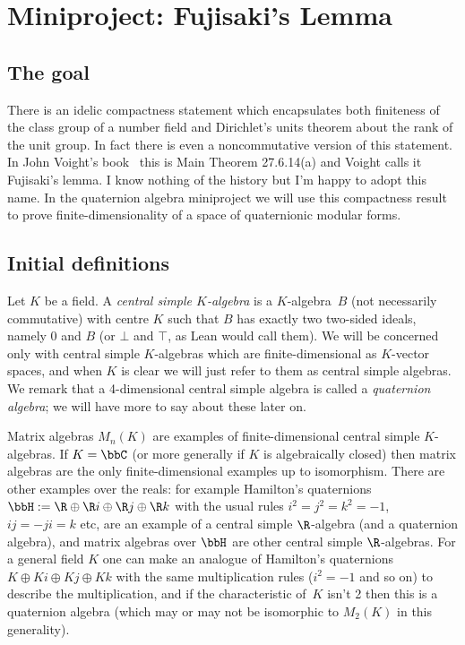 \chapter{Miniproject: Fujisaki's Lemma}\label{Fujisaki_project}

\section{The goal}

There is an idelic compactness statement which encapsulates both finiteness of the class
group of a number field and Dirichlet's units theorem about the rank of the unit group.
In fact there is even a noncommutative version of this statement. In John Voight's
book~\cite{voightbook} this is Main Theorem 27.6.14(a) and Voight calls it Fujisaki’s lemma.
I know nothing of the history but I'm happy to adopt this name. In the quaternion algebra
miniproject we will use this compactness result to prove finite-dimensionality of a
space of quaternionic modular forms.

\section{Initial definitions}

Let $K$ be a field. A \emph{central simple $K$-algebra} is a $K$-algebra~$B$ (not necessarily
commutative) with centre $K$ such that $B$ has exactly two two-sided ideals, namely ${0}$ and $B$
(or $\bot$ and $\top$, as Lean would call them). We will be concerned
only with central simple $K$-algebras which are finite-dimensional as $K$-vector spaces, and
when $K$ is clear we will just refer to them as central simple algebras. We remark that a
4-dimensional central simple algebra is called a \emph{quaternion algebra}; we will have
more to say about these later on.

Matrix algebras $M_n(K)$ are examples of finite-dimensional central simple $K$-algebras.
If $K=\bbC$ (or more generally if $K$ is algebraically closed)
then matrix algebras are the only finite-dimensional examples
up to isomorphism. There are other examples over the reals: for example Hamilton's quaternions
$\bbH:=\R\oplus\R i\oplus\R j\oplus\R k$ with the usual rules $i^2=j^2=k^2=-1$,
$ij=-ji=k$ etc, are an example of a central simple $\R$-algebra (and a quaternion algebra), and
matrix algebras over $\bbH$ are other central simple $\R$-algebras.
For a general field $K$
one can make an analogue of Hamilton's quaternions $K\oplus Ki\oplus Kj\oplus Kk$ with the
same multiplication rules ($i^2=-1$ and so on) to describe the multiplication, and if the characteristic
of~$K$ isn't 2
then this is a quaternion algebra (which may or may not be isomorphic to $M_2(K)$ in this
generality).

